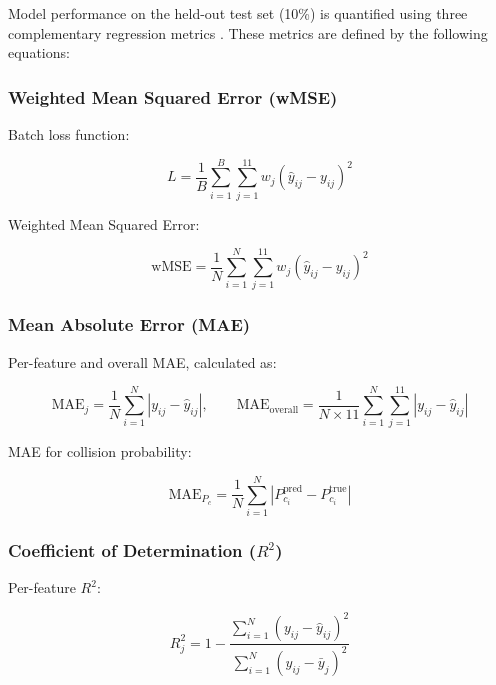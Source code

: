 \documentclass[12pt, a4paper]{article}
\begin{document}
Model performance on the held-out test set (10\%) is quantified using three complementary regression metrics \cite{ref5, ref6}. These metrics are defined by the following equations:

\subsubsection{Weighted Mean Squared Error (wMSE)}

Batch loss function:

\begin{equation}
    L = \frac{1}{B} \sum_{i=1}^{B} \sum_{j=1}^{11} w_j \left(\hat{y}_{ij} - y_{ij}\right)^2
    \label{eq:batch_loss}
\end{equation}

Weighted Mean Squared Error:

\begin{equation}
    \text{wMSE} = \frac{1}{N} \sum_{i=1}^{N} \sum_{j=1}^{11} w_j \left(\hat{y}_{ij} - y_{ij}\right)^2
    \label{eq:wmse}
\end{equation}

\subsubsection{Mean Absolute Error (MAE)}

Per-feature and overall MAE, calculated as:

\begin{equation}
    \text{MAE}_j = \frac{1}{N} \sum_{i=1}^{N} \left| y_{ij} - \hat{y}_{ij} \right|, \qquad
    \text{MAE}_{\text{overall}} = \frac{1}{N \times 11} \sum_{i=1}^{N} \sum_{j=1}^{11} \left| y_{ij} - \hat{y}_{ij} \right|
    \label{eq:mae}
\end{equation}

MAE for collision probability:

\begin{equation}
    \text{MAE}_{P_c} = \frac{1}{N} \sum_{i=1}^{N} \left| P_{c_i}^{\text{pred}} - P_{c_i}^{\text{true}} \right|
    \label{eq:mae_pc}
\end{equation}

\subsubsection{Coefficient of Determination ($R^2$)}

Per-feature $R^2$:

\begin{equation}
    R_j^2 = 1 - \frac{\displaystyle\sum_{i=1}^{N} \left(y_{ij} - \hat{y}_{ij}\right)^2}
                     {\displaystyle\sum_{i=1}^{N} \left(y_{ij} - \bar{y}_j\right)^2}
    \label{eq:r2_j}
\end{equation}
\end{document}
